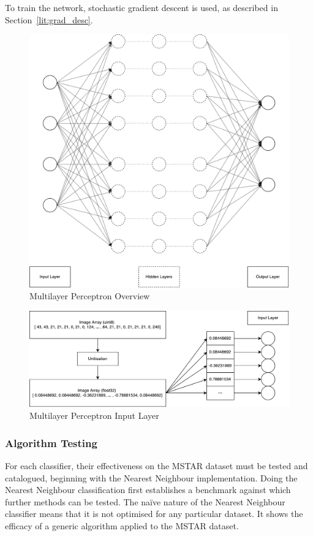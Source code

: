  To train the network, stochastic gradient descent is used, as described in Section~\ref{lit:grad_desc}. 

\begin{figure}[!h]
	
	\centering
	\includegraphics[width=\textwidth]{figures/multilayer_perceptron}
	\centering
	\caption{Multilayer Perceptron Overview}
	\label{fig:multi}
\end{figure}


\begin{figure}[!h]
	
	\centering
	\includegraphics[width=\textwidth]{figures/multilayer_perceptron_input}
	\centering
	\caption{Multilayer Perceptron Input Layer}
	\label{fig:multi_input}
\end{figure}


\subsubsection{Algorithm Testing}
For each classifier, their effectiveness on the MSTAR dataset must be tested and catalogued, beginning with the Nearest Neighbour implementation. Doing the Nearest Neighbour classification first establishes a benchmark against which further methods can be tested. The na{\"i}ve nature of the Nearest Neighbour classifier means that it is not optimised for any particular dataset. It shows the efficacy of a generic algorithm applied to the MSTAR dataset.

